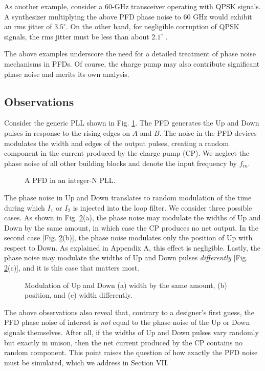 As another example, consider a 60-GHz transceiver operating with QPSK signals. A synthesizer multiplying the above PFD phase
noise to 60 GHz would exhibit an rms jitter of $3.5^\circ$. On the other hand, for negligible corruption of QPSK signals, the rms jitter
must be less than about $2.1^\circ$ \cite{Chen}.

The above examples underscore the need for a detailed treatment of phase noise mechanisms in PFDs. Of course, the
charge pump may also contribute significant phase noise and merits its own analysis.

\subsection{Observations}
Consider the generic PLL shown in Fig. \ref{pll}. The PFD generates the Up and Down pulses in response to the rising edges on $A$ and $B$. The
noise in the PFD devices modulates the width and edges of the output pulses, creating a random component in the current produced by the charge
pump (CP). We neglect the phase noise of all other building blocks and denote the input frequency by $f_{in}$. 
\begin{figure}[htb]
\vspace{2.4in}
\caption{A PFD in an integer-N PLL.}
\label{pll}
\end{figure}

The phase noise in Up and Down translates to random modulation of the time during which $I_1$ or $I_2$ is injected into the loop filter.
We consider three possible cases. As shown in Fig. \ref{3cases}(a), the phase noise may modulate the widths of Up and Down by the same amount,
in which case the CP produces no net output. In the second case [Fig. \ref{3cases}(b)], the phase noise modulates only the position of Up with
respect to Down. As explained in Appendix A, this effect is negligible. Lastly, the phase noise may modulate the widths of Up and Down
pulses {\em differently} [Fig. \ref{3cases}(c)], and it is this case that matters most.
\begin{figure}[htb]
\vspace{3in}
\caption{Modulation of Up and Down (a) width by the same amount, (b) position, and (c) width differently.}
\label{3cases}
\end{figure}

The above observations also reveal that, contrary to a designer's first guess, the PFD phase noise of interest is {\em not} equal to
the phase noise of the Up or Down signals themselves. After all, if the widths of Up and Down pulses vary randomly but exactly in unison, then the
net current produced by the CP contains no random component. This point raises the question of how exactly the PFD noise must be
simulated, which we address in Section VII.

